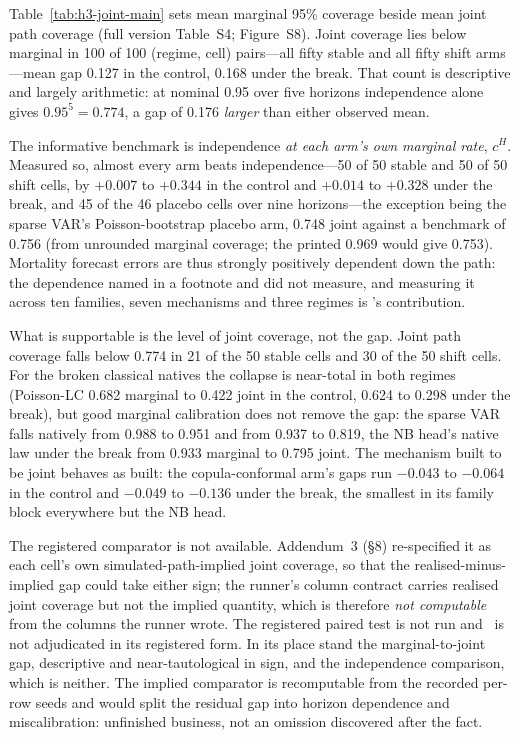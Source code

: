 
Table~\ref{tab:h3-joint-main} sets mean marginal 95\% coverage beside mean joint
path coverage (full version Table~S4; Figure~S8). Joint coverage lies below
marginal in 100 of 100 (regime, cell) pairs---all fifty stable and all fifty
shift arms---mean gap 0.127 in the control, 0.168 under the break. That count is
descriptive and largely arithmetic: at nominal 0.95 over five horizons
independence alone gives $0.95^5 = 0.774$, a gap of 0.176 \emph{larger} than
either observed mean.

The informative benchmark is independence \emph{at each arm's own marginal
rate}, $c^{H}$. Measured so, almost every arm beats independence---50 of 50
stable and 50 of 50 shift cells, by $+0.007$ to $+0.344$ in the control and
$+0.014$ to $+0.328$ under the break, and 45 of the 46 placebo cells over nine
horizons---the exception being the sparse VAR's Poisson-bootstrap placebo arm,
0.748 joint against a benchmark of 0.756 (from unrounded marginal coverage; the
printed 0.969 would give 0.753). Mortality forecast errors are thus strongly
positively dependent down the path: the dependence \citet{dowd2010backtesting}
named in a footnote and did not measure, and measuring it across ten families,
seven mechanisms and three regimes is \Hthree's contribution.

What is supportable is the level of joint coverage, not the gap. Joint path
coverage falls below 0.774 in 21 of the 50 stable cells and 30 of the 50 shift
cells. For the broken classical natives the collapse is near-total in both
regimes (Poisson-LC 0.682 marginal to 0.422 joint in the control, 0.624 to 0.298
under the break), but good marginal calibration does not remove the gap: the
sparse VAR falls natively from 0.988 to 0.951 and from 0.937 to 0.819, the NB
head's native law under the break from 0.933 marginal to 0.795 joint. The
mechanism built to be joint behaves as built: the copula-conformal arm's gaps
run $-0.043$ to $-0.064$ in the control and $-0.049$ to $-0.136$ under the
break, the smallest in its family block everywhere but the NB head.

The registered comparator is not available. Addendum~3 (\S8) re-specified it as
each cell's own simulated-path-implied joint coverage, so that the
realised-minus-implied gap could take either sign; the runner's column contract
carries realised joint coverage but not the implied quantity, which is therefore
\emph{not computable} from the columns the runner wrote. The registered paired
test is not run and \Hthree\ is not adjudicated in its registered form. In its
place stand the marginal-to-joint gap, descriptive and near-tautological in
sign, and the independence comparison, which is neither. The implied comparator
is recomputable from the recorded per-row seeds and would split the residual gap
into horizon dependence and miscalibration: unfinished business, not an omission
discovered after the fact.

